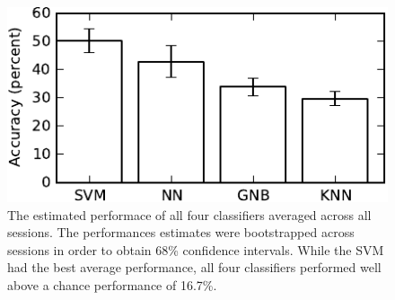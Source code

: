 \documentclass[5p,authoryear]{elsarticle}
\begin{document}


\begin{figure}
\centering
\includegraphics{figures/performance}
\caption{The estimated performace of all four classifiers averaged across all sessions.
The performances estimates were bootstrapped across sessions in order to obtain 68\% confidence intervals.
While the SVM had the best average performance, all four classifiers performed well above a chance performance of 16.7\%.}
\label{fig:performance}
\end{figure}
\end{document}
